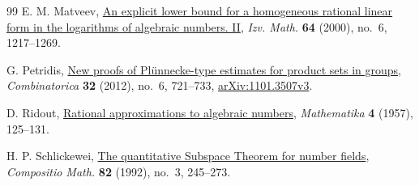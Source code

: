 \documentclass[11pt,reqno]{amsart}
\theoremstyle{definition}
\begin{document}
\begin{thebibliography}{99}
E. M. Matveev,
\href{https://doi.org/10.1070/IM2000v064n06ABEH000314}{An explicit
lower bound for a homogeneous rational linear form in the logarithms
of algebraic numbers. II}, \emph{Izv. Math.} \textbf{64} (2000),
no.~6, 1217--1269.

G. Petridis,
\href{https://doi.org/10.1007/s00493-012-2818-5}{New proofs of
Pl\"unnecke-type estimates for product sets in groups},
\emph{Combinatorica} \textbf{32} (2012), no.~6, 721--733,
\href{https://arxiv.org/abs/1101.3507v3}{arXiv:1101.3507v3}.

D. Ridout,
\href{https://doi.org/10.1112/S0025579300001182}{Rational
approximations to algebraic numbers},
\emph{Mathematika} \textbf{4} (1957), 125--131.

H. P. Schlickewei,
\href{https://www.numdam.org/item/CM_1992__82_3_245_0/}{The
quantitative Subspace Theorem for number fields},
\emph{Compositio Math.} \textbf{82} (1992), no.~3, 245--273.

\end{thebibliography}
\end{document}
